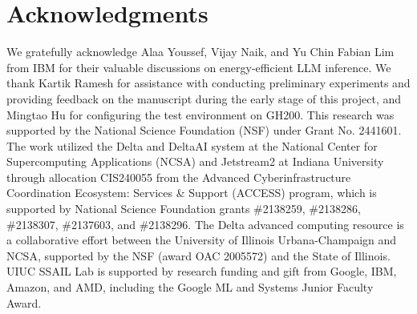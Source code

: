 \section{Acknowledgments}

We gratefully acknowledge Alaa Youssef, Vijay Naik, and Yu Chin Fabian Lim from IBM for their valuable discussions on energy-efficient LLM inference. 
We thank Kartik Ramesh for assistance with conducting preliminary experiments and providing feedback on the manuscript during the early stage of this project, and Mingtao Hu for configuring the test environment on GH200.
This research was supported by the National Science Foundation (NSF) under Grant No. 2441601.
The work utilized the Delta and DeltaAI system at the National Center for Supercomputing Applications (NCSA) and Jetstream2 at Indiana University through allocation CIS240055 from the Advanced Cyberinfrastructure Coordination Ecosystem: Services \& Support (ACCESS) program, which is supported by National Science Foundation grants \#2138259, \#2138286, \#2138307, \#2137603, and \#2138296.
The Delta advanced computing resource is a collaborative effort between the University of Illinois Urbana-Champaign and NCSA, supported by the NSF (award OAC 2005572) and the State of Illinois.
UIUC SSAIL Lab is supported by research funding and gift from Google, IBM, Amazon, and AMD, including the Google ML and Systems Junior Faculty Award.
